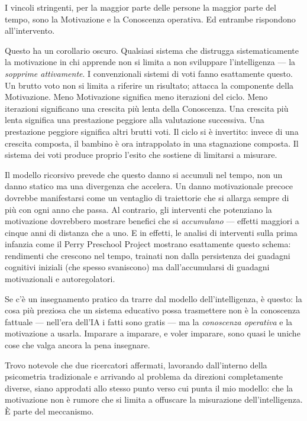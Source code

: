 \documentclass[11pt, twoside, openright]{book}
\begin{document}
I vincoli stringenti, per la maggior parte delle persone la maggior parte del tempo, sono la Motivazione e la Conoscenza operativa. Ed entrambe rispondono all'intervento.

Questo ha un corollario oscuro. Qualsiasi sistema che distrugga sistematicamente la motivazione in chi apprende non si limita a non sviluppare l'intelligenza --- la \textit{sopprime attivamente}. I convenzionali sistemi di voti fanno esattamente questo. Un brutto voto non si limita a riferire un risultato; attacca la componente della Motivazione. Meno Motivazione significa meno iterazioni del ciclo. Meno iterazioni significano una crescita più lenta della Conoscenza. Una crescita più lenta significa una prestazione peggiore alla valutazione successiva. Una prestazione peggiore significa altri brutti voti. Il ciclo si è invertito: invece di una crescita composta, il bambino è ora intrappolato in una stagnazione composta. Il sistema dei voti produce proprio l'esito che sostiene di limitarsi a misurare.

Il modello ricorsivo prevede che questo danno si accumuli nel tempo, non un danno statico ma una divergenza che accelera. Un danno motivazionale precoce dovrebbe manifestarsi come un ventaglio di traiettorie che si allarga sempre di più con ogni anno che passa. Al contrario, gli interventi che potenziano la motivazione dovrebbero mostrare benefici che si \textit{accumulano} --- effetti maggiori a cinque anni di distanza che a uno. E in effetti, le analisi di interventi sulla prima infanzia come il Perry Preschool Project mostrano esattamente questo schema: rendimenti che crescono nel tempo, trainati non dalla persistenza dei guadagni cognitivi iniziali (che spesso svaniscono) ma dall'accumularsi di guadagni motivazionali e autoregolatori.

Se c'è un insegnamento pratico da trarre dal modello dell'intelligenza, è questo: la cosa più preziosa che un sistema educativo possa trasmettere non è la conoscenza fattuale --- nell'era dell'IA i fatti sono gratis --- ma la \textit{conoscenza operativa} e la motivazione a usarla. Imparare a imparare, e voler imparare, sono quasi le uniche cose che valga ancora la pena insegnare.

Trovo notevole che due ricercatori affermati, lavorando dall'interno della psicometria tradizionale e arrivando al problema da direzioni completamente diverse, siano approdati allo stesso punto verso cui punta il mio modello: che la motivazione non è rumore che si limita a offuscare la misurazione dell'intelligenza. È parte del meccanismo.
\end{document}

